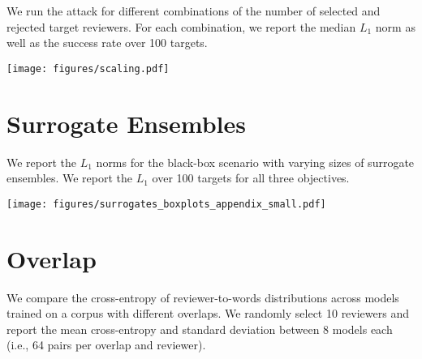 \documentclass[letterpaper,twocolumn,10pt]{article}
\begin{document}
We run the attack for different combinations of the number of selected and rejected target reviewers. For each combination, we report the median $L_1$ norm as well as the success rate over 100 targets.

\begin{center}
    \texttt{[image: figures/scaling.pdf]}
\end{center}

\newpage
\section{Surrogate Ensembles}
\label{app:surrogate-boxplots}
\vspace{-0.5em}

We report the $L_1$ norms for the black-box scenario with varying sizes of {surrogate\EndAccSupp{}} ensembles. We report the $L_1$ over 100 targets for all three objectives.

\begin{center}
\texttt{[image: figures/surrogates\_boxplots\_appendix\_small.pdf]}  
\end{center}

\section{Overlap}
\label{app:cp-overlap}
\vspace{-0.5em}

We compare the cross-entropy of reviewer-to-words distributions across models trained on a corpus with different overlaps. We randomly select 10 reviewers and report the mean cross-entropy and standard deviation between 8 models each (i.e., 64 pairs per overlap and reviewer).
\end{document}

